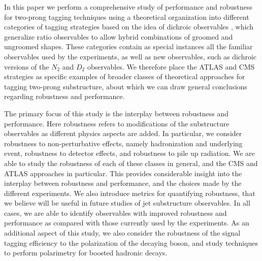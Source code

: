 \documentclass[11pt,letterpaper]{article}
\begin{document}
In this paper we perform a comprehensive study of performance and robustness for two-prong tagging techniques using a theoretical organization into different categories of tagging strategies based on the idea of dichroic observables \cite{Salam:2016yht}, which generalize ratio observables to allow hybrid combinations of groomed and ungroomed shapes. These categories contain as special instances all the familiar observables used by the experiments, as well as new observables, such as dichroic versions of the $N_2$ and $D_2$ observables. We therefore place the ATLAS and CMS strategies as specific examples of broader classes of theoretical approaches for tagging two-prong substructure, about which we can draw general conclusions regarding robustness and performance.


The primary focus of this study is the interplay between robustness and performance. Here robustness refers to modifications of the substructure observables as different physics aspects are added. In particular, we consider robustness to non-perturbative effects, namely hadronization and underlying event, robustness to detector effects, and robustness to pile up radiation. We are able to study the robustness of each of these classes in general, and the CMS and ATLAS approaches in particular. This provides considerable insight into the interplay between robustness and performance, and the choices made by the different experiments. We also introduce metrics for quantifying robustness, that we believe will be useful in future studies of jet substructure observables. In all cases, we are able to identify observables with improved robustness and performance as compared with those currently used by the experiments. As an additional aspect of this study, we also consider the robustness of the signal tagging efficiency to the polarization of the decaying boson, and study techniques to perform polarimetry for boosted hadronic decays. 




 

\end{document}
